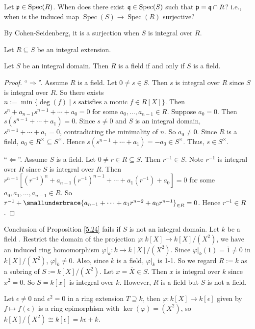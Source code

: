 \begin{discussion}\label{5.23}
    Let $\mathfrak{p} \in \operatorname{Spec}(R)$. When does there exist $\mathfrak{q} \in \operatorname{Spec}(S)$ such that $\mathfrak{p} = \mathfrak{q} \cap R$? i.e., when is the induced map $\operatorname{Spec}(S) \to \operatorname{Spec}(R)$ surjective? \par 
    By Cohen-Seidenberg, it is a surjection when $S$ is integral over $R$.
\end{discussion}

\noindent Let $R \subseteq S$ be an integral extension.

\begin{proposition}\label{5.24}
    Let $S$ be an integral domain. Then $R$ is a field if and only if $S$ is a field.
\end{proposition}

\begin{proof}
    ``$\Rightarrow$''. Assume $R$ is a field. Let $0 \neq s \in S$. Then $s$ is integral over $R$ since $S$ is integral over $R$. So there exists $n := \min\{\deg(f) \mid s \text{ satisfies a monic }f \in R[X]\}$. Then $s^{n} + a_{n-1}s^{n-1} + \cdots + a_0 = 0$ for some $a_0,\ldots,a_{n-1} \in R$. Suppose $a_0 = 0$. Then $s(s^{n-1} + \cdots + a_1) = 0$. Since $s \neq 0$ and $S$ is an integral domain, $s^{n-1} + \cdots +a_1 = 0$, contradicting the minimality of $n$. So $a_0 \neq 0$. Since $R$ is a field, $a_0 \in R^{\times} \subseteq S^{\times}$. Hence $s(s^{n-1} + \cdots + a_1) = -a_0 \in S^{\times}$. Thus, $s \in S^{\times}$. \par 
    ``$\Leftarrow$''. Assume $S$ is a field. Let $0 \neq r \in R \subseteq S$. Then $r^{-1} \in S$. Note $r^{-1}$ is integral over $R$ since $S$ is integral over $R$. Then $r^{n-1}[(r^{-1})^{n} + a_{n-1}(r^{-1})^{n-1} + \cdots + a_1(r^{-1}) + a_0] = 0$ for some $a_0,a_1,\ldots,a_{n-1} \in R$. So $r^{-1} + \smallunderbrace{a_{n-1} + \cdots + a_1r^{n-2} + a_0r^{n-1}}_{\in R} = 0$. Hence $r^{-1} \in R$.
\end{proof}

\begin{example*}
    Conclusion of Proposition \ref{5.24} fails if $S$ is not an integral domain. Let $k$ be a field . Restrict the domain of the projection $\varphi: k[X] \to k[X]/(X^{2})$, we have an induced ring homomorphism $\varphi|_k: k \to k[X]/(X^{2})$. Since $\varphi|_k(1) = \overbar{1} \neq 0$ in $k[X]/(X^{2})$, $\varphi|_k \neq 0$. Also, since $k$ is a field, $\varphi|_k$ is 1-1. So we regard $R := k$ as a subring of $S := k[X]/(X^{2})$. Let $x = \overbar{X} \in S$. Then $x$ is integral over $k$ since $x^{2} = 0$. So $S = k[x]$ is integral over $k$. However, $R$ is a field but $S$ is not a field.  \par
    Let $\epsilon \neq 0$ and $\epsilon^{2} = 0$ in a ring extension $T \supseteq k$, then $\varphi: k[X] \to k[\epsilon]$ given by $f \mapsto f(\epsilon)$ is a ring epimorphism with $\ker(\varphi) = (X^{2})$, so $k[X]/(X^{2}) \cong k[\epsilon] = k\epsilon + k$.
\end{example*}

